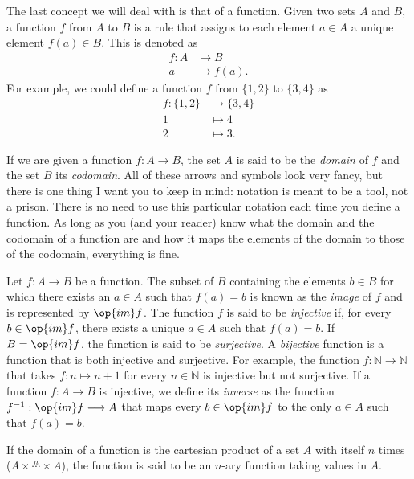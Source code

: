 \begin{para}[Functions]
The last concept we will deal with is that of a function. Given two sets $A$ and $B$, a function $f$ from $A$ to $B$ is a rule that assigns to each element $a\in A$ a unique element $f(a)\in B$. This is denoted as
\begin{align*}
f : A & \longrightarrow B \\
a & \longmapsto f(a).
\end{align*}
For example, we could define a function $f$ from $\{1,2\}$ to $\{3,4\}$ as
\begin{align*}
f: \{1,2\} &\longrightarrow \{3,4\} \\
1 &\longmapsto 4\\
2 &\longmapsto 3.
\end{align*}

If we are given a function $f:A\longrightarrow B$, the set $A$ is said to be the \emph{domain} of $f$ and the set $B$ its \emph{codomain}.
All of these arrows and symbols look very fancy, but there is one thing I want you to keep in mind: notation is meant to be a tool, not a prison.
There is no need to use this particular notation each time you define a function. As long as you (and your reader) know what the domain and the codomain of a function are and how it maps the elements of the domain to those of the codomain, everything is fine. 

Let $f:A\longrightarrow B$ be a function. The subset of $B$ containing the elements $b\in B$ for which there exists an $a\in A$ such that $f(a) = b$ is known as the \emph{image} of $f$ and is represented by $\op{im} f$. The function $f$ is said to be \emph{injective} if, for every $b\in \op{im} f$, there exists a unique $a\in A$ such that $f(a) = b$. If $B = \op{im} f$, the function is said to be \emph{surjective}. A \emph{bijective} function is a function that is both injective and surjective.
For example, the function $f:\mathbb{N}\longrightarrow\mathbb{N}$ that takes $f:n\longmapsto n+1$ for every $n\in\mathbb{N}$ is injective but not surjective.
If a function $f:A\longrightarrow B$ is injective, we define its \emph{inverse} as the function $f^{-1} : \op{im} f \longrightarrow A$ that maps every $b\in \op{im} f$ to the only $a\in A$ such that $f(a) = b$.

If the domain of a function is the cartesian product of a set $A$ with itself $n$ times ($A\times \overset{n}{\cdots} \times A$), the function is said to be an $n$-ary function taking values in $A$.
\end{para}

